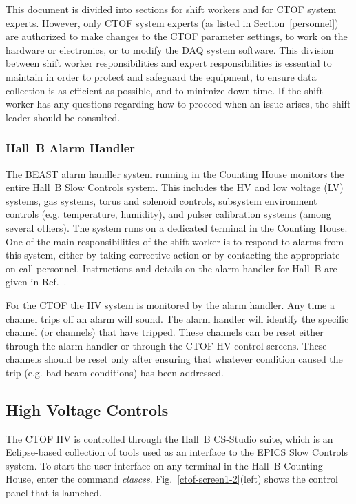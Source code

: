 \documentclass[12pt]{article}
\begin{document}
This document is divided into sections for shift workers and for CTOF system experts. However, only CTOF
system experts (as listed in Section~\ref{personnel}) are authorized to make changes to the CTOF parameter
settings, to work on the hardware or electronics, or to modify the DAQ system software. This division between
shift worker responsibilities and expert responsibilities is essential to maintain in order to protect and
safeguard the equipment, to ensure data collection is as efficient as possible, and to minimize down time. If
the shift worker has any questions regarding how to proceed when an issue arises, the shift leader should be
consulted.

\subsubsection{Hall~B Alarm Handler}
\label{alarms}

The BEAST alarm handler system running in the Counting House monitors the entire Hall~B Slow Controls
system. This includes the HV and low voltage (LV) systems, gas systems, torus and solenoid controls,
subsystem environment controls (e.g. temperature, humidity), and pulser calibration systems (among several
others). The system runs on a dedicated terminal in the Counting House. One of the main responsibilities of
the shift worker is to respond to alarms from this system, either by taking corrective action or by contacting
the appropriate on-call personnel. Instructions and details on the alarm handler for Hall~B are given in
Ref.~\cite{beast}.

For the CTOF the HV system is monitored by the alarm handler. Any time a channel trips off an alarm will sound.
The alarm handler will identify the specific channel (or channels) that have tripped. These channels can be reset
either through the alarm handler or through the CTOF HV control screens. These channels should be reset only
after ensuring that whatever condition caused the trip (e.g. bad beam conditions) has been addressed. 

\subsection{High Voltage Controls}
\label{hv-control}

The CTOF HV is controlled through the Hall~B CS-Studio suite, which is an Eclipse-based collection of tools used
as an interface to the EPICS Slow Controls system. To start the user interface on any terminal in the Hall~B
Counting House, enter the command {\it clascss}. Fig.~\ref{ctof-screen1-2}(left) shows the control panel that is
launched.
\end{document}

